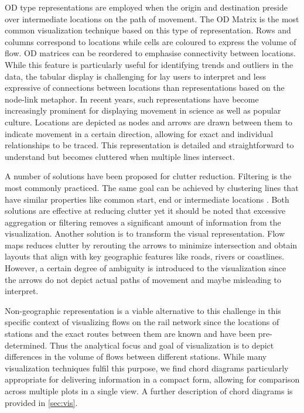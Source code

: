 \documentclass{sig-alternate}
\begin{document}
OD type representations are employed when the origin and destination preside over intermediate locations on the path of movement. The OD Matrix is the most common visualization technique based on this type of representation. 
Rows and columns correspond to locations while cells are coloured to express the volume of flow.
OD matrices can be reordered to emphasise connectivity between locations.
While this feature is particularly useful for identifying trends and outliers in the data, the tabular display is challenging for lay users to interpret and less expressive of connections between locations than representations based on the node-link metaphor.
In recent years, such representations have become increasingly prominent for displaying movement in science as well as popular culture.
Locations are depicted as nodes and arrows are drawn between them to indicate movement in a certain direction, allowing for exact and individual relationships to be traced. 
This representation is detailed and straightforward to understand but becomes cluttered when multiple lines intersect. 

A number of solutions have been proposed for clutter reduction. 
Filtering is the most commonly practiced. 
The same goal can be achieved by clustering lines that have similar properties like common start, end or intermediate locations \cite{andrienko2007visual} . 
Both solutions are effective at reducing clutter yet it should be noted that excessive aggregation or filtering removes a significant amount of information from the visualization.
Another solution is to transform the visual representation. 
Flow maps \cite{phan2005flow} reduces clutter by rerouting the arrows to minimize intersection and obtain layouts that align with key geographic features like roads, rivers or coastlines. 
However, a certain degree of ambiguity is introduced to the visualization since the arrows do not depict actual paths of movement and maybe misleading to interpret.

Non-geographic representation is a viable alternative to this challenge in this specific context of visualizing flows on the rail network since the locations of stations and the exact routes between them are known and have been pre-determined. 
Thus the analytical focus and goal of visualization is to depict differences in the volume of flows between different stations. 
While many visualization techniques fulfil this purpose, we find chord diagrams \cite{krzywinski2009circos} particularly appropriate for delivering information in a compact form, allowing for comparison across multiple plots in a single view.
A further description of chord diagrams is provided in \cref{sec:vis}.
\end{document}
